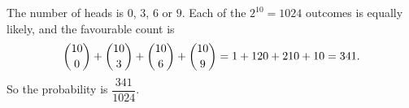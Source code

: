 The number of heads is $0$, $3$, $6$ or $9$. Each of the $2^{10}=1024$ outcomes is equally likely, and the favourable count is
\[
\dbinom{10}{0}+\dbinom{10}{3}+\dbinom{10}{6}+\dbinom{10}{9}=1+120+210+10=341 .
\]
So the probability is $\boxed{\dfrac{341}{1024}}$.

